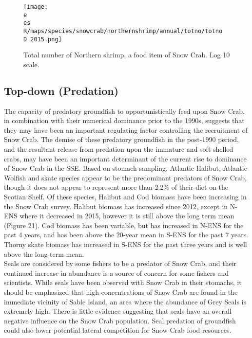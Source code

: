 \documentclass[paper=a4, fontsize=11pt]{article}
\newcommand{\D}{.}
\newcommand{\e}{/home/michelle/ecomod_data/}
\newcommand{\es}{snowcrab/}
\begin{document}
\begin{figure}[h]
  \centering
     \texttt{[image: \\e \\es R/maps/species/snowcrab/northernshrimp/annual/totno/totno\\D 2015.png]}
    \caption{Total number of Northern shrimp, a food item of Snow Crab. Log 10 scale.}
\end{figure}

\subsection{Top-down (Predation)}
The capacity of predatory groundfish to opportunistically feed upon Snow Crab, in combination with their numerical dominance prior to the 1990s, suggests that they may have been an important regulating factor controlling the recruitment of Snow Crab. The demise of these predatory groundfish in the post-1990 period, and the resultant release from predation upon the immature and soft-shelled crabs, may have been an important determinant of the current rise to dominance of Snow Crab in the SSE. Based on stomach sampling, Atlantic Halibut, Atlantic Wolfish and skate species appear to be the predominant predators of Snow Crab, though it does not appear to represent more than 2.2\% of their diet on the Scotian Shelf. Of these species, Halibut and Cod biomass have been increasing in the Snow Crab survey. Halibut biomass has increased since 2012, except in N-ENS where it decreased in 2015, however it is still above the long term mean (Figure 21). Cod biomass has been variable, but has increased in N-ENS for the past 4 years, and has been above the 20-year mean in S-ENS for the past 7 years. Thorny skate biomass has increased in S-ENS for the past three years and is well above the long-term mean.\\   

Seals are considered by some fishers to be a predator of Snow Crab, and their continued increase in abundance is a source of concern for some fishers and scientists. While seals have been observed with Snow Crab in their stomachs, it should be emphasized that high concentrations of Snow Crab are found in the immediate vicinity of Sable Island, an area where the abundance of Grey Seals is extremely high. There is little evidence suggesting that seals have an overall negative influence on the Snow Crab population. Seal predation of groundfish could also lower potential lateral competition for Snow Crab food resources. 
\end{document}
